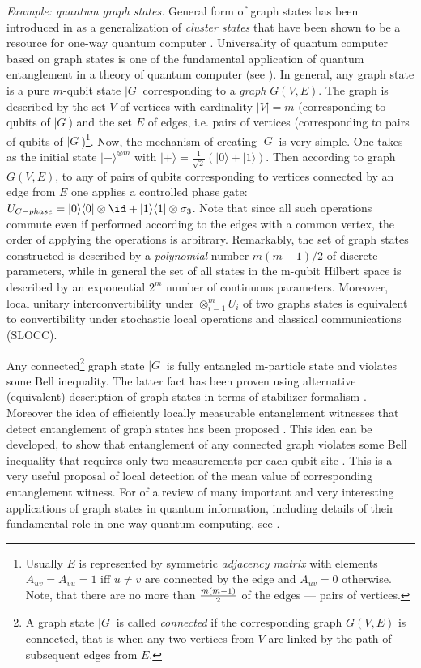 \documentclass[twocolumn,aps,rmp]{revtex4}
\begin{document}
{\it Example: quantum graph states.} General form of graph states
has been introduced in \cite{RaussendorfEtAlGraphIntroduced2003} as
a generalization of {\it cluster states}
\cite{BriegelRaussendorfClaster} that have been shown to be a
resource for one-way quantum computer
\cite{RaussendorfBriegelOneWay}. Universality of quantum computer
based on graph states is one of the fundamental application of
quantum entanglement in a theory of quantum computer (see
\cite{GraphStates}). In general, any graph state is a pure $m$-qubit
state $|G\>$ corresponding to a {\it graph} $G(V,E)$. The graph is
described  by the set $V$ of vertices with cardinality $|V|=m$
 (corresponding to qubits of $|G\>$) and the set
$E$ of edges, i.e. pairs of vertices (corresponding to
pairs of qubits of $|G\>$)\footnote{Usually $E$ is represented by
symmetric {\it adjacency matrix} with elements
$A_{uv}=A_{vu}=1$ iff $u\neq v$ are connected by the edge
and $A_{uv}=0$ otherwise. Note, that there are no more than
$m(m-1)\over 2$ of the edges --- pairs of vertices.}. Now, the
mechanism of creating $|G\>$ is very simple. One takes as the
initial state $|+\rangle^{\otimes m}$ with
$|+\rangle=\frac{1}{\sqrt{2}}(|0\rangle + |1\rangle)$. Then
according to graph $G(V,E)$, to any of pairs of qubits corresponding
to vertices connected by an edge from $E$ one applies a controlled
phase gate: $U_{C-phase}=|0\rangle\langle 0| \otimes \id
+|1\rangle\langle 1| \otimes \sigma_{3}$. Note that since all such
operations commute even if performed according to the edges with a
common vertex, the order of applying the operations is arbitrary.
Remarkably, the set of graph states constructed is described by a
{\it polynomial} number $m(m-1)/2$ of discrete parameters, while in
general the set of all states in the m-qubit Hilbert space is
described by an exponential $2^{m}$ number of continuous parameters.
Moreover, local unitary interconvertibility under
$\otimes_{i=1}^{m}U_{i}$ of two graphs states is equivalent to
convertibility under stochastic local operations and classical
communications (SLOCC).

Any connected\footnote{A graph state $|G\>$ is called {\it connected}
  if the corresponding graph $G(V,E)$ is connected, that is when any
  two vertices from $V$ are linked by the path of subsequent edges
  from $E$.} graph state $|G\>$ is fully entangled m-particle state
and violates some Bell inequality. The latter fact has been proven
\cite{GraphBellStabiliser} using alternative (equivalent) description
of graph states in terms of stabilizer formalism \cite{GottesmanPhd}.
Moreover the idea of efficiently locally measurable entanglement
witnesses that detect entanglement of graph states has been proposed
\cite{TothG_s}. This idea can be developed, to show that entanglement
of any connected graph violates some Bell inequality that requires
only two measurements per each qubit site \cite{TothGB2006}. This is a
very useful proposal of local detection of the mean value of
corresponding entanglement witness. For of a review of many important
and very interesting applications of graph states in quantum
information, including details of their fundamental role in one-way
quantum computing, see \cite{GraphStates}.
\end{document}
